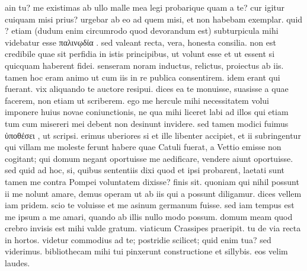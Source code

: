 


 ain tu? me existimas ab ullo malle mea legi probarique quam a te? cur igitur cuiquam misi prius? urgebar ab eo ad quem misi, et non habebam exemplar. quid ? etiam (dudum enim circumrodo quod devorandum est) subturpicula mihi videbatur esse παλινῳδία . sed valeant recta, vera, honesta consilia. non est credibile quae sit perfidia in istis principibus, ut volunt esse et ut essent si quicquam haberent fidei. senseram noram inductus, relictus, proiectus ab iis. tamen hoc eram animo ut cum iis in re publica consentirem. idem erant qui fuerant. vix aliquando te auctore resipui. dices ea te monuisse, suasisse a quae facerem, non etiam ut scriberem. ego me hercule mihi necessitatem volui imponere huius novae coniunctionis, ne qua mihi liceret labi ad illos qui etiam tum cum misereri mei debent non desinunt invidere. sed tamen modici fuimus ὑποθέσει , ut scripsi. erimus uberiores si et ille libenter accipiet, et ii subringentur qui villam me moleste ferunt habere quae Catuli fuerat, a Vettio emisse non cogitant; qui domum negant oportuisse me aedificare, vendere aiunt oportuisse. sed quid ad hoc, si, quibus sententiis dixi quod et ipsi probarent, laetati sunt tamen me contra Pompei voluntatem dixisse? finis sit. quoniam qui nihil possunt ii me nolunt amare, demus operam ut ab iis qui a possunt diligamur. dices vellem iam pridem. scio te voluisse et me asinum germanum fuisse. sed iam tempus est me ipsum a me amari, quando ab illis nullo modo possum. domum meam quod crebro invisis est mihi valde gratum. viaticum Crassipes praeripit. tu de via recta in hortos. videtur commodius ad te; postridie scilicet; quid enim tua? sed viderimus. bibliothecam mihi tui pinxerunt constructione et sillybis. eos velim laudes.

